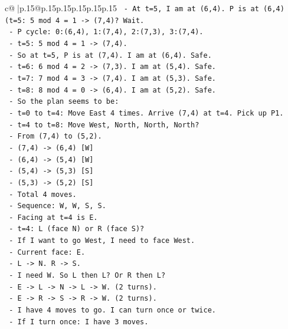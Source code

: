 \documentclass{article}
\begin{document}
{\begin{supertabular}{c@{$\;$}|p{.15\linewidth}@{}p{.15\linewidth}p{.15\linewidth}p{.15\linewidth}p{.15\linewidth}p{.15\linewidth}}
{{{\texttt{    {-} At t=5, I am at (6,4). P is at (6,4) (t=5: 5 mod 4 = 1 {-}> (7,4)? Wait.} \\
\texttt{      {-} P cycle: 0:(6,4), 1:(7,4), 2:(7,3), 3:(7,4).} \\
\texttt{      {-} t=5: 5 mod 4 = 1 {-}> (7,4).} \\
\texttt{      {-} So at t=5, P is at (7,4). I am at (6,4). Safe.} \\
\texttt{      {-} t=6: 6 mod 4 = 2 {-}> (7,3). I am at (5,4). Safe.} \\
\texttt{      {-} t=7: 7 mod 4 = 3 {-}> (7,4). I am at (5,3). Safe.} \\
\texttt{      {-} t=8: 8 mod 4 = 0 {-}> (6,4). I am at (5,2). Safe.} \\
\texttt{  {-} So the plan seems to be:} \\
\texttt{    {-} t=0 to t=4: Move East 4 times. Arrive (7,4) at t=4. Pick up P1.} \\
\texttt{    {-} t=4 to t=8: Move West, North, North, North?} \\
\texttt{      {-} From (7,4) to (5,2).} \\
\texttt{      {-} (7,4) {-}> (6,4) {[}W{]}} \\
\texttt{      {-} (6,4) {-}> (5,4) {[}W{]}} \\
\texttt{      {-} (5,4) {-}> (5,3) {[}S{]}} \\
\texttt{      {-} (5,3) {-}> (5,2) {[}S{]}} \\
\texttt{      {-} Total 4 moves.} \\
\texttt{      {-} Sequence: W, W, S, S.} \\
\texttt{      {-} Facing at t=4 is E.} \\
\texttt{      {-} t=4: L (face N) or R (face S)?} \\
\texttt{        {-} If I want to go West, I need to face West.} \\
\texttt{        {-} Current face: E.} \\
\texttt{        {-} L {-}> N. R {-}> S.} \\
\texttt{        {-} I need W. So L then L? Or R then L?} \\
\texttt{        {-} E {-}> L {-}> N {-}> L {-}> W. (2 turns).} \\
\texttt{        {-} E {-}> R {-}> S {-}> R {-}> W. (2 turns).} \\
\texttt{        {-} I have 4 moves to go. I can turn once or twice.} \\
\texttt{        {-} If I turn once: I have 3 moves.} \\
}}}
\end{supertabular}}
\end{document}
